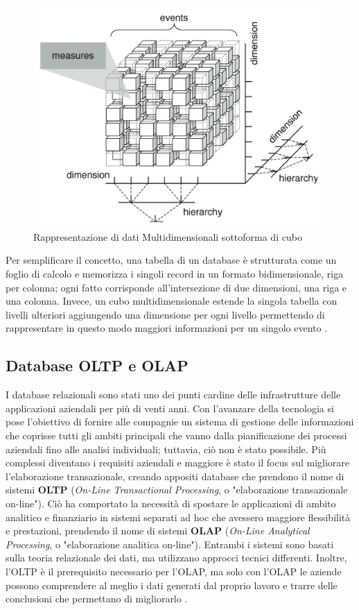 \begin{figure}
    \centering
    \includegraphics[width=0.85\linewidth]{figure/capitolo_2/Multidimensional Data Cube.pdf}
    \caption{Rappresentazione di dati Multidimensionali sottoforma di cubo}
    \label{fig:Multidimensional Data Cube}
\end{figure}

Per semplificare il concetto, una tabella di un database è strutturata come un foglio di calcolo e memorizza i singoli record in un formato bidimensionale, riga per colonna; ogni fatto corrisponde all'intersezione di due dimensioni, una riga e una colonna. Invece, un cubo multidimensionale estende la singola tabella con livelli ulteriori aggiungendo una dimensione per ogni livello permettendo di rappresentare in questo modo maggiori informazioni per un singolo evento \cite{ibm_multidimensional_data}.

\subsection{Database OLTP e OLAP}

I database relazionali sono stati uno dei punti cardine delle infrastrutture delle applicazioni aziendali per più di venti anni. Con l'avanzare della tecnologia si pose l'obiettivo di fornire alle compagnie un sistema di gestione delle informazioni che coprisse tutti gli ambiti principali che vanno dalla pianificazione dei processi aziendali fino alle analisi individuali; tuttavia, ciò non è stato possibile. Più complessi diventano i requisiti aziendali e maggiore è stato il focus sul migliorare l'elaborazione transazionale, creando appositi database che prendono il nome di sistemi \textbf{OLTP} (\textit{On-Line Transactional Processing}, o "elaborazione transazionale on-line"). Ciò ha comportato la necessità di spostare le applicazioni di ambito analitico e finanziario in sistemi separati ad hoc che avessero maggiore flessibilità e prestazioni, prendendo il nome di sistemi \textbf{OLAP} (\textit{On-Line Analytical Processing}, o "elaborazione analitica on-line"). Entrambi i sistemi sono basati sulla teoria relazionale dei dati, ma utilizzano approcci tecnici differenti. Inoltre, l'OLTP è il prerequisito necessario per l'OLAP, ma solo con l'OLAP le aziende possono comprendere al meglio i dati generati dal proprio lavoro e trarre delle conclusioni che permettano di migliorarlo \cite{scribd_oltp_olap}.

